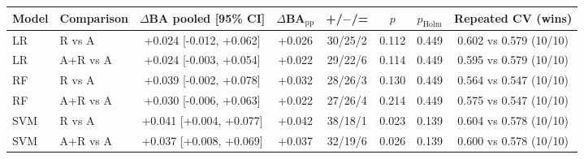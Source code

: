 \begin{tabular}{@{}llcccccc@{}}
\toprule
Model & Comparison & $\Delta$BA pooled [95\% CI] & $\Delta$BA$_\mathrm{pp}$ & +/$-$/= & $p$ & $p_\mathrm{Holm}$ & Repeated CV (wins) \\
\midrule
LR & R vs A & +0.024 [-0.012, +0.062] & +0.026 & 30/25/2 & 0.112 & 0.449 & 0.602 vs 0.579 (10/10) \\
LR & A+R vs A & +0.024 [-0.003, +0.054] & +0.022 & 29/22/6 & 0.114 & 0.449 & 0.595 vs 0.579 (10/10) \\
RF & R vs A & +0.039 [-0.002, +0.078] & +0.032 & 28/26/3 & 0.130 & 0.449 & 0.564 vs 0.547 (10/10) \\
RF & A+R vs A & +0.030 [-0.006, +0.063] & +0.022 & 27/26/4 & 0.214 & 0.449 & 0.575 vs 0.547 (10/10) \\
SVM & R vs A & +0.041 [+0.004, +0.077] & +0.042 & 38/18/1 & 0.023 & 0.139 & 0.604 vs 0.578 (10/10) \\
SVM & A+R vs A & +0.037 [+0.008, +0.069] & +0.037 & 32/19/6 & 0.026 & 0.139 & 0.600 vs 0.578 (10/10) \\
\bottomrule
\end{tabular}
